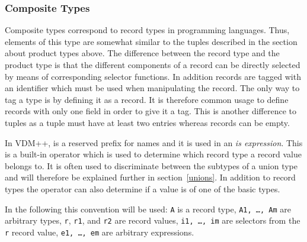 \documentclass[\pformat,12pt]{article}
\newcommand{\vdmslpp}[2]{%
#2
}
\newcommand{\vdmsl}{VDM-SL}
\newcommand{\vdmpp}{VDM++}
\begin{document}
\subsubsection{Composite Types}\label{records}

Composite types correspond to record types in programming languages.
Thus, elements of this type are somewhat similar to the tuples
described in the section about product types above. The difference
between the record type and the product type is that the different
components of a record can be directly selected by means of
corresponding selector functions. In addition records are tagged with
an identifier which must be used when manipulating the record. The
only way to tag a type is by defining it as a record. It is therefore
common usage to define records with only one field in order to give it
a tag. This is another difference to tuples as a tuple must have at
least two entries whereas records can be empty.

In \vdmslpp{\vdmsl,}{\vdmpp,}  is a reserved prefix for names
and it is used in an {\it is expression}. This is a built-in operator
which is used to determine which record type a record value belongs to.
It is often used to discriminate between the subtypes of a union type
and will therefore be explained further in section~\ref{unions}. In
addition to record types the  operator can also determine if
a value is of one of the basic types.
 
In the following this convention will be used: {\tt A} is a record
type, {\tt A1, \ldots, Am} are arbitrary types, {\tt r}, {\tt r1}, and
{\tt r2} are record values, {\tt i1, \ldots, im} are selectors from
the {\tt r} record value, {\tt e1, \ldots, em} are arbitrary
expressions.
\end{document}
